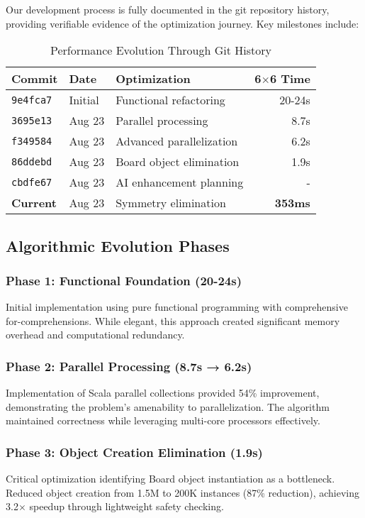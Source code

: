 \documentclass[12pt,a4paper]{article}
\theoremstyle{definition}
\begin{document}
Our development process is fully documented in the git repository history, providing verifiable evidence of the optimization journey. Key milestones include:

\begin{table}[h]
\centering
\caption{Performance Evolution Through Git History}
\begin{tabular}{@{}lllr@{}}
\toprule
Commit & Date & Optimization & 6$\times$6 Time \\
\midrule
\texttt{9e4fca7} & Initial & Functional refactoring & 20-24s \\
\texttt{3695e13} & Aug 23 & Parallel processing & 8.7s \\
\texttt{f349584} & Aug 23 & Advanced parallelization & 6.2s \\
\texttt{86ddebd} & Aug 23 & Board object elimination & 1.9s \\
\texttt{cbdfe67} & Aug 23 & AI enhancement planning & - \\
\textbf{Current} & Aug 23 & Symmetry elimination & \textbf{353ms} \\
\bottomrule
\end{tabular}
\end{table}

\subsection{Algorithmic Evolution Phases}

\subsubsection{Phase 1: Functional Foundation (20-24s)}
Initial implementation using pure functional programming with comprehensive for-comprehensions. While elegant, this approach created significant memory overhead and computational redundancy.

\subsubsection{Phase 2: Parallel Processing (8.7s → 6.2s)}
Implementation of Scala parallel collections provided 54\% improvement, demonstrating the problem's amenability to parallelization. The algorithm maintained correctness while leveraging multi-core processors effectively.

\subsubsection{Phase 3: Object Creation Elimination (1.9s)}
Critical optimization identifying Board object instantiation as a bottleneck. Reduced object creation from 1.5M to 200K instances (87\% reduction), achieving 3.2$\times$ speedup through lightweight safety checking.
\end{document}
